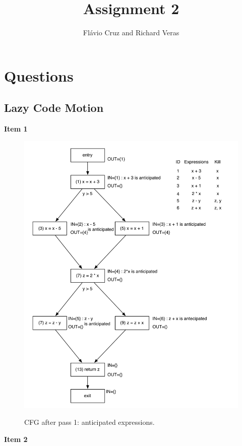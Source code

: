 \documentclass[12pt]{article}
\author{Fl\'{a}vio Cruz and Richard Veras}
\title{Assignment 2}
\begin{document}
\maketitle

\section{Questions}
\subsection{Lazy Code Motion}

\textbf{Item 1}

\begin{figure}[!htbp]
    \centering
    \caption{CFG after pass 1: anticipated expressions.}
    \includegraphics[scale=0.65]{cfg.pdf}
    \label{fig:cfg1}
\end{figure}

\pagebreak

\textbf{Item 2}
\end{document}
